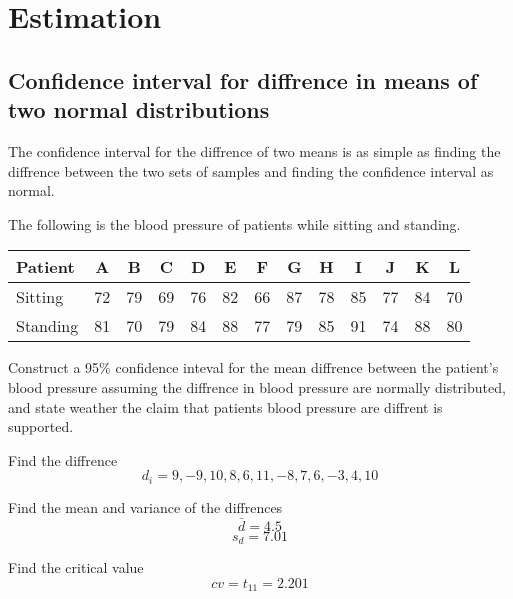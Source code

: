 \section{Estimation}
    \subsection{Confidence interval for diffrence in means of two normal distributions}
        The confidence interval for the diffrence of two means is as simple as finding the diffrence between the two sets of samples and finding the confidence interval as normal.

        \begin{example}
        {
            The following is the blood pressure of patients while sitting and standing.

            \begin{center}
            \begin{tabular}{l|c|c|c|c|c|c|c|c|c|c|c|c}
                Patient     & A & B & C & D & E & F & G & H & I & J & K & L \\
                \hline
                Sitting     & 72 & 79 & 69 & 76 & 82 & 66 & 87 & 78 & 85 & 77 & 84 & 70 \\
                Standing    & 81 & 70 & 79 & 84 & 88 & 77 & 79 & 85 & 91 & 74 & 88 & 80 
            \end{tabular}
            \end{center}

            Construct a 95\% confidence inteval for the mean diffrence between the patient's blood pressure assuming the diffrence in blood pressure are normally distributed, and state weather the claim that patients blood pressure are diffrent is supported.
        }

        \begin{step}{Find the diffrence}
            $$
                d_i = 9, -9, 10, 8, 6, 11, -8, 7, 6, -3, 4, 10
            $$
        \end{step}

        \begin{step}{Find the mean and variance of the diffrences}
            $$
                \bar{d} = 4.5
            $$
            $$
                s_d = 7.01
            $$
        \end{step}

        \begin{step}{Find the critical value}
            $$
                cv = t_{11} = 2.201
            $$
        \end{step}


\end{example}
